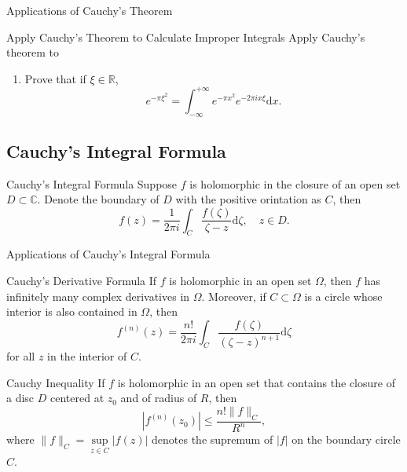 \begin{example}{Applications of Cauchy's Theorem}{}
  
\end{example}

\begin{example}{Apply Cauchy's Theorem to Calculate Improper Integrals}{}
  Apply Cauchy's theorem to 
  \begin{enumerate}
  \item Prove that if $\xi \in \mathbb{R}$,
    \begin{equation}
      e^{- \pi \xi^2} = \int_{-\infty}^{+\infty} e^{-\pi x^2} e^{-2\pi i x \xi} \mathrm{d} x.
    \end{equation}
  \end{enumerate}
\end{example}

\subsection{Cauchy's Integral Formula}

\begin{theorem}{Cauchy's Integral Formula}{}
  Suppose $f$ is holomorphic in the closure of an open set $D \subset \mathbb{C}$.
  Denote the boundary of $D$ with the positive orintation as $C$, then
  \begin{equation}
    f(z) = \frac{1}{2 \pi i} \int_C \frac{f(\zeta)}{\zeta - z}\mathrm{d} \zeta, \quad
    z \in D.
  \end{equation}
\end{theorem}

\begin{example}{Applications of Cauchy's Integral Formula}{}
  
\end{example}

\begin{corollary}{Cauchy's Derivative Formula}{}
  If $f$ is holomorphic in an open set $\Omega$,
  then $f$ has infinitely many complex derivatives in $\Omega$.
  Moreover, if $C \subset \Omega$ is a circle whose interior is also contained in $\Omega$,
  then
  \begin{equation}
    f^{(n)}(z) = \frac{n!}{2 \pi i} \int_C \frac{f(\zeta)}{(\zeta - z)^{n+1}}\mathrm{d} \zeta
  \end{equation}
  for all $z$ in the interior of $C$.
\end{corollary}

\begin{corollary}{Cauchy Inequality}{}
  If $f$ is holomorphic in an open set that contains the closure of a disc $D$
  centered at $z_0$ and of radius of $R$, then
  \begin{equation}
    |f^{(n)}(z_0)| \leq \frac{n! \|f\|_C}{R^n},
  \end{equation}
  where $\|f\|_C = \sup \limits_{z \in C}|f(z)|$ denotes the supremum of $|f|$
  on the boundary circle $C$.
\end{corollary}

